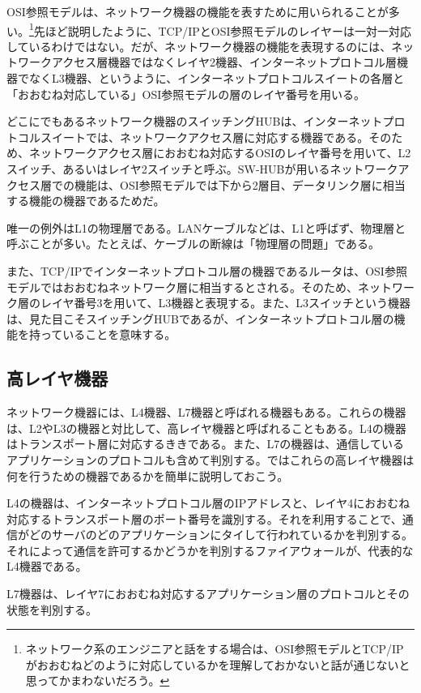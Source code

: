 OSI参照モデルは、ネットワーク機器の機能を表すために用いられることが多い。\footnote{ネットワーク系のエンジニアと話をする場合は、OSI参照モデルとTCP/IPがおおむねどのように対応しているかを理解しておかないと話が通じないと思ってかまわないだろう。}先ほど説明したように、TCP/IPとOSI参照モデルのレイヤーは一対一対応しているわけではない。だが、ネットワーク機器の機能を表現するのには、ネットワークアクセス層機器ではなくレイヤ2機器、インターネットプロトコル層機器でなくL3機器、というように、インターネットプロトコルスイートの各層と「おおむね対応している」OSI参照モデルの層のレイヤ番号を用いる。

どこにでもあるネットワーク機器のスイッチングHUBは、インターネットプロトコルスイートでは、ネットワークアクセス層に対応する機器である。そのため、ネットワークアクセス層におおむね対応するOSIのレイヤ番号を用いて、L2スイッチ、あるいはレイヤ2スイッチと呼ぶ。SW-HUBが用いるネットワークアクセス層での機能は、OSI参照モデルでは下から2層目、データリンク層に相当する機能の機器であるためだ。

唯一の例外はL1の物理層である。LANケーブルなどは、L1と呼ばず、物理層と呼ぶことが多い。たとえば、ケーブルの断線は「物理層の問題」である。

また、TCP/IPでインターネットプロトコル層の機器であるルータは、OSI参照モデルではおおむねネットワーク層に相当するとされる。そのため、ネットワーク層のレイヤ番号3を用いて、L3機器と表現する。また、L3スイッチという機器は、見た目こそスイッチングHUBであるが、インターネットプロトコル層の機能を持っていることを意味する。

\subsection{高レイヤ機器}

ネットワーク機器には、L4機器、L7機器と呼ばれる機器もある。これらの機器は、L2やL3の機器と対比して、高レイヤ機器と呼ばれることもある。L4の機器はトランスポート層に対応するききである。また、L7の機器は、通信しているアプリケーションのプロトコルも含めて判別する。ではこれらの高レイヤ機器は何を行うための機器であるかを簡単に説明しておこう。

L4の機器は、インターネットプロトコル層のIPアドレスと、レイヤ4におおむね対応するトランスポート層のポート番号を識別する。それを利用することで、通信がどのサーバのどのアプリケーションにタイして行われているかを判別する。それによって通信を許可するかどうかを判別するファイアウォールが、代表的なL4機器である。

L7機器は、レイヤ7におおむね対応するアプリケーション層のプロトコルとその状態を判別する。

